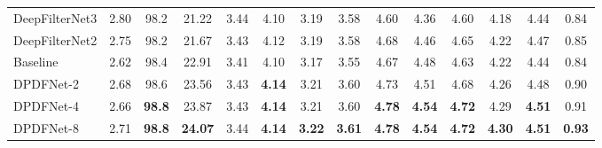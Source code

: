 \documentclass[final,5p,times,authoryear]{elsarticle}
\begin{document}
\begin{table}
\begin{tabular}{lccccccccccccc}
    DeepFilterNet3 & 2.80 & 98.2 & 21.22 & 3.44 & 4.10 & 3.19 & 3.58 & 4.60 & 4.36 & 4.60 & 4.18 & 4.44 & \cellcolor{prismblue}0.84 \\
    DeepFilterNet2 & 2.75 & 98.2 & 21.67 & 3.43 & 4.12 & 3.19 & 3.58 & 4.68 & 4.46 & 4.65 & 4.22 & 4.47 & \cellcolor{prismblue}0.85 \\
    \midrule
    Baseline & 2.62 & 98.4 & 22.91 & 3.41 & 4.10 & 3.17 & 3.55 & 4.67 & 4.48 & 4.63 & 4.22 & 4.44 & \cellcolor{prismblue}0.84 \\
    DPDFNet-2 & 2.68 & 98.6 & 23.56 & 3.43 & \textbf{4.14} & 3.21 & 3.60 & 4.73 & 4.51 & 4.68 & 4.26 & 4.48 & \cellcolor{prismblue}0.90 \\
    DPDFNet-4 & 2.66 & \textbf{98.8} & 23.87 & 3.43 & \textbf{4.14} & 3.21 & 3.60 & \textbf{4.78} & \textbf{4.54} & \textbf{4.72} & 4.29 & \textbf{4.51} & \cellcolor{prismblue}0.91 \\
    DPDFNet-8 & 2.71 & \textbf{98.8} & \textbf{24.07} & 3.44 & \textbf{4.14} & \textbf{3.22} & \textbf{3.61} & \textbf{4.78} & \textbf{4.54} & \textbf{4.72} & \textbf{4.30} & \textbf{4.51} & \cellcolor{prismblue}\textbf{0.93} \\
    \bottomrule
    \end{tabular}
    \label{tab:csv_full_results_with_intrusive}
\end{table}
\end{document}

